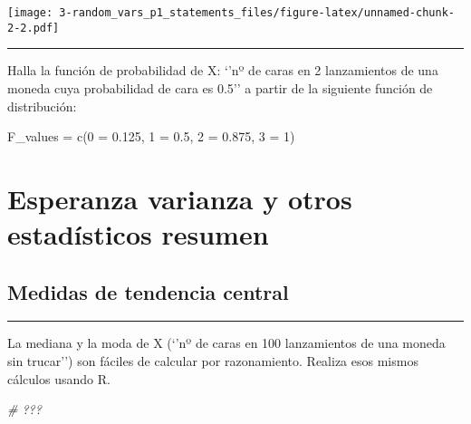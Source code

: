 \documentclass[
]{article}
\newenvironment{Shaded}{\begin{snugshade}}{\end{snugshade}}
\newcommand{\CommentTok}[1]{\textcolor[rgb]{0.56,0.35,0.01}{\textit{#1}}}
\newcommand{\DecValTok}[1]{\textcolor[rgb]{0.00,0.00,0.81}{#1}}
\newcommand{\FloatTok}[1]{\textcolor[rgb]{0.00,0.00,0.81}{#1}}
\newcommand{\FunctionTok}[1]{\textcolor[rgb]{0.00,0.00,0.00}{#1}}
\newcommand{\NormalTok}[1]{#1}
\newcommand{\OtherTok}[1]{\textcolor[rgb]{0.56,0.35,0.01}{#1}}
\newcommand{\StringTok}[1]{\textcolor[rgb]{0.31,0.60,0.02}{#1}}
\begin{document}
\texttt{[image: 3-random\_vars\_p1\_statements\_files/figure-latex/unnamed-chunk-2-2.pdf]}

\begin{center}\rule{0.5\linewidth}{0.5pt}\end{center}

Halla la función de probabilidad de X: `'nº de caras en 2 lanzamientos
de una moneda cuya probabilidad de cara es 0.5'' a partir de la
siguiente función de distribución:

\begin{Shaded}
\begin{Highlighting}[]
\NormalTok{F\_values }\OtherTok{=} \FunctionTok{c}\NormalTok{(}\StringTok{\textquotesingle{}0\textquotesingle{}} \OtherTok{=} \FloatTok{0.125}\NormalTok{, }\StringTok{\textquotesingle{}1\textquotesingle{}} \OtherTok{=} \FloatTok{0.5}\NormalTok{, }\StringTok{\textquotesingle{}2\textquotesingle{}} \OtherTok{=} \FloatTok{0.875}\NormalTok{, }\StringTok{\textquotesingle{}3\textquotesingle{}} \OtherTok{=} \DecValTok{1}\NormalTok{)}
\end{Highlighting}
\end{Shaded}

\hypertarget{esperanza-varianza-y-otros-estaduxedsticos-resumen}{%
\section{Esperanza varianza y otros estadísticos
resumen}\label{esperanza-varianza-y-otros-estaduxedsticos-resumen}}

\hypertarget{medidas-de-tendencia-central}{%
\subsection{Medidas de tendencia
central}\label{medidas-de-tendencia-central}}

\begin{center}\rule{0.5\linewidth}{0.5pt}\end{center}

La mediana y la moda de X (`'nº de caras en 100 lanzamientos de una
moneda sin trucar'') son fáciles de calcular por razonamiento. Realiza
esos mismos cálculos usando R.

\begin{Shaded}
\begin{Highlighting}[]
\CommentTok{\# ???}
\end{Highlighting}
\end{Shaded}
\end{document}
